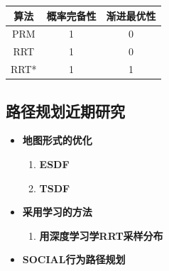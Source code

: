\documentclass[../main.tex]{subfiles}
\begin{document}
\begin{enumerate}
\begin{figure}[H]
                \label{fig:rrts_process}
            \end{figure}
    \begin{center}
    \begin{tabular}{ccc}
      \toprule
      \textbf{算法} & \textbf{概率完备性} & \textbf{渐进最优性} \\
      \midrule
      PRM  & 1 & 0 \\
      RRT  & 1 & 0 \\
      RRT* & 1 & 1 \\
      \bottomrule
    \end{tabular}
    \end{center}
    \end{enumerate}

\subsection{路径规划近期研究}\label{subsec:recent_research}
\begin{itemize}
    \item \textbf{地图形式的优化}\label{item:recent:map}
        \begin{enumerate}
            \item \textbf{ESDF}\label{item:recent:map:esdf}
            \item \textbf{TSDF}\label{item:recent:map:tsdf}
        \end{enumerate}
    \item \textbf{采用学习的方法}\label{item:recent:learning}
        \begin{enumerate}
            \item \textbf{用深度学习学RRT采样分布}\label{item:recent:learning:deep_rrt}
        \end{enumerate}
    \item \textbf{SOCIAL行为路径规划}\label{item:recent:social}
\end{itemize}
\end{document}
